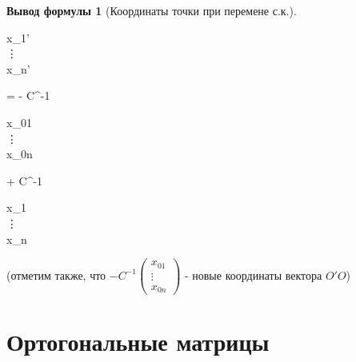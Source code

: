 \documentclass[a4paper, 12pt]{article}
\theoremstyle{definition}
\newtheorem*{formula}{Вывод формулы}
\newenvironment{boxedalign*}
  {\begin{equation*}\begin{lrbox}{\boxedalignbox}$\begin{aligned}}
  {\end{aligned}$\end{lrbox}\fbox{\usebox{\boxedalignbox}}\end{equation*}}
\begin{document}
\begin{formula}[Координаты точки при перемене с.к.]
		\begin{boxedalign*}\begin{pmatrix} x_{1}' \\ \vdots \\ x_{n}' \end{pmatrix} = - C^{-1}\begin{pmatrix} x_{01} \\ \vdots \\ x_{0n} \end{pmatrix} + C^{-1}\begin{pmatrix} x_{1} \\ \vdots \\ x_{n} \end{pmatrix} \end{boxedalign*}
		(отметим также, что $- C^{-1}\begin{pmatrix} x_{01} \\ \vdots \\ x_{0n} \end{pmatrix}$ - новые координаты вектора $O'O$)
	\end{formula}
	\section{Ортогональные матрицы}
\end{document}
